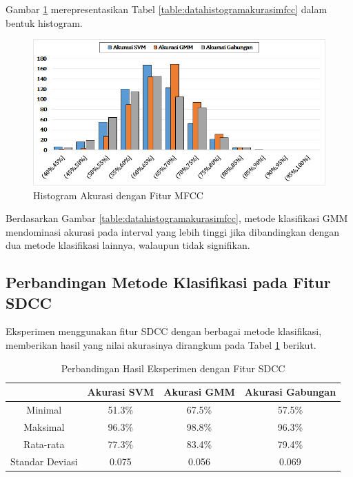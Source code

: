   Gambar \ref{fig:histogramakurasimfcc} merepresentasikan Tabel \ref{table:datahistogramakurasimfcc} dalam bentuk histogram.
  \begin{figure}
    \centering
    \includegraphics[width=\linewidth]{pics/histogram_akurasi_mfcc}
    \caption{Histogram Akurasi dengan Fitur MFCC}
    \label{fig:histogramakurasimfcc}
  \end{figure}

  Berdasarkan Gambar \ref{table:datahistogramakurasimfcc}, metode klasifikasi GMM mendominasi akurasi pada interval yang lebih tinggi jika dibandingkan dengan dua metode klasifikasi lainnya, walaupun tidak signifikan.



  \subsection{Perbandingan Metode Klasifikasi pada Fitur SDCC}
  Eksperimen menggunakan fitur SDCC dengan berbagai metode klasifikasi, memberikan hasil yang nilai akurasinya dirangkum pada Tabel \ref{table:perbandingansdcc} berikut.

  \begin{table}
    \centering
    \caption{Perbandingan Hasil Eksperimen dengan Fitur SDCC}
    \begin{tabular}{|c|c|c|c|}
      \hline
       & Akurasi SVM & Akurasi GMM & Akurasi Gabungan \\ \hline
      Minimal         & 51.3\% & 67.5\% & 57.5\% \\ \hline
      Maksimal        & 96.3\% & 98.8\% & 96.3\% \\ \hline
      Rata-rata       & 77.3\% & 83.4\% & 79.4\% \\ \hline
      Standar Deviasi & 0.075  & 0.056  & 0.069  \\ \hline
    \end{tabular}
    \label{table:perbandingansdcc}
  \end{table}

